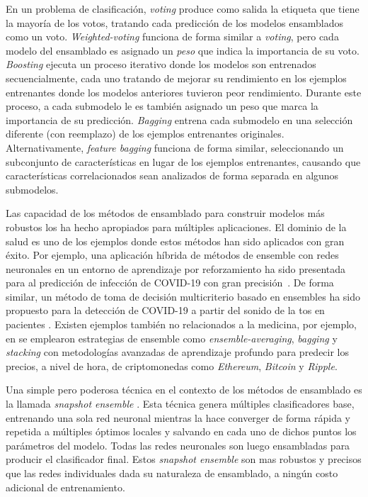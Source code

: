 En un problema de clasificación, \emph{voting} produce como salida la etiqueta que tiene la mayoría de los votos, tratando cada predicción de los modelos ensamblados como un voto.
\emph{Weighted-voting} funciona de forma similar a \emph{voting}, pero cada modelo del ensamblado es asignado un \emph{peso} que indica la importancia de su voto.
\emph{Boosting} ejecuta un proceso iterativo donde los modelos son entrenados secuencialmente, cada uno tratando de mejorar su rendimiento en los ejemplos entrenantes donde los modelos anteriores tuvieron peor rendimiento.
Durante este proceso, a cada submodelo le es también asignado un peso que marca la importancia de su predicción.
\textit{Bagging} entrena cada submodelo en una selección diferente (con reemplazo) de los ejemplos entrenantes originales.
Alternativamente, \textit{feature bagging} funciona de forma similar, seleccionando un subconjunto de características en lugar de los ejemplos entrenantes, causando que características correlacionados sean analizados de forma separada en algunos submodelos.

Las capacidad de los métodos de ensamblado para construir modelos más robustos los ha hecho apropiados para múltiples aplicaciones.
El dominio de la salud es uno de los ejemplos donde estos métodos han sido aplicados con gran éxito.
Por ejemplo, una aplicación híbrida de métodos de ensemble con redes neuronales en un entorno de aprendizaje por reforzamiento ha sido presentada para al predicción de infección de COVID-19 con gran precisión~\parencite{JIN2022105560}.
De forma similar, un método de toma de decisión multicriterio basado en ensembles ha sido propuesto para la detección de COVID-19 a partir del sonido de la tos en pacientes \parencite{CHOWDHURY2022105405}.
Existen ejemplos también no relacionados a la medicina, por ejemplo, en \parencite{livieris2020ensemble} se emplearon estrategias de ensemble como \textit{ensemble-averaging}, \textit{bagging} y \textit{stacking} con metodologías avanzadas de aprendizaje profundo para predecir los precios, a nivel de hora, de criptomonedas como \textit{Ethereum}, \textit{Bitcoin} y \textit{Ripple}.

Una simple pero poderosa técnica en el contexto de los métodos de ensamblado es la llamada \textit{snapshot ensemble} \parencite{huang17snapshot}. Esta técnica genera múltiples clasificadores base, entrenando una sola red neuronal mientras la hace converger de forma rápida y repetida a múltiples óptimos locales y salvando en cada uno de dichos puntos los parámetros del modelo. Todas las redes neuronales son luego ensambladas para producir el clasificador final. Estos \textit{snapshot ensemble} son mas robustos y precisos que las redes individuales dada su naturaleza de ensamblado, a ningún costo adicional de entrenamiento.

